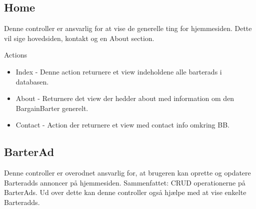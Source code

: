 \subsection{Home}
Denne controller er ansvarlig for at vise de generelle ting for hjemmesiden. Dette vil sige hovedsiden, kontakt og en About section.  

Actions
\begin{itemize}
	\item Index
	- Denne action returnere et view indeholdene alle barterads i databasen. 
	\item About
	- Returnere det view der hedder about med information om den BargainBarter generelt.
	\item Contact
	- Action der returnere et view med contact info omkring BB.
\end{itemize}


\subsection{BarterAd}
Denne controller er overodnet ansvarlig for, at brugeren kan oprette og opdatere Barteradds annoncer på hjemmesiden. Sammenfattet: CRUD operationerne på BarterAds. Ud over dette kan denne controller også hjælpe med at vise enkelte Barteradds.

